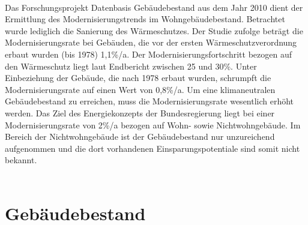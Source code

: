 \\
Das Forschungsprojekt Datenbasis Gebäudebestand aus dem Jahr 2010 dient der Ermittlung des Modernisierungstrends im Wohngebäudebestand. Betrachtet wurde lediglich die Sanierung des Wärmeschutzes. Der Studie zufolge beträgt die Modernisierungsrate bei Gebäuden, die vor der ersten Wärmeschutzverordnung erbaut wurden (bis 1978) 1,1\%/a. Der Modernisierungsfortschritt bezogen auf den Wärmeschutz liegt laut Endbericht zwischen 25 und 30\%. Unter Einbeziehung der Gebäude, die nach 1978 erbaut wurden, schrumpft die Modernisierungsrate auf einen Wert von 0,8\%/a. Um eine klimaneutralen Gebäudebestand zu erreichen, muss die Modernisierungsrate wesentlich erhöht werden. Das Ziel des Energiekonzepts der Bundesregierung liegt bei einer Modernisierungsrate von 2\%/a bezogen auf Wohn- sowie Nichtwohngebäude.
Im Bereich der Nichtwohngebäude ist der Gebäudebestand nur unzureichend aufgenommen und die dort vorhandenen Einsparungspotentiale sind somit nicht bekannt. \\
\\

\chapter{Gebäudebestand}
\label{cha:Gebäudebestand}


